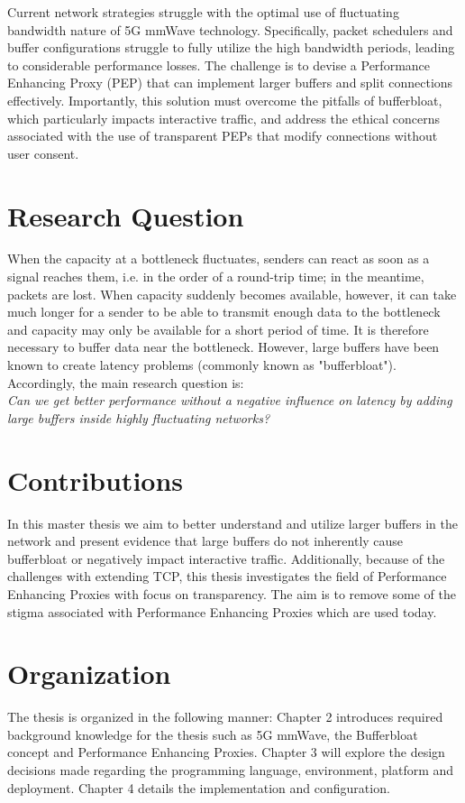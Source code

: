 \documentclass[a4paper,english, 11pt]{report}
\begin{document}
Current network strategies struggle with the optimal use of fluctuating bandwidth nature of 5G mmWave technology\cite{Srivastava_Fund_Panwar_2020}. Specifically, packet schedulers and buffer configurations struggle to fully utilize the high bandwidth periods, leading to considerable performance losses. The challenge is to devise a Performance Enhancing Proxy (PEP) that can implement larger buffers and split connections effectively. Importantly, this solution must overcome the pitfalls of bufferbloat\cite{hingane2020aqm}, which particularly impacts interactive traffic, and address the ethical concerns associated with the use of transparent PEPs that modify connections without user consent.

\section{Research Question}
When the capacity at a bottleneck fluctuates, senders can react as soon as a signal reaches them, i.e. in the order of a round-trip time; in the meantime, packets are lost. When capacity suddenly becomes available, however, it can take much longer for a sender to be able to transmit enough data to the bottleneck and capacity may only be available for a short period of time. It is therefore necessary to buffer data near the bottleneck. However, large buffers have been known to create latency problems (commonly known as "bufferbloat").\\

Accordingly, the main research question is:\\
\textit{Can we get better performance without a negative influence on latency by adding large buffers inside highly fluctuating networks?}

\section{Contributions}
In this master thesis we aim to better understand and utilize larger buffers in the network and present evidence that large buffers do not inherently cause bufferbloat or negatively impact interactive traffic. Additionally, because of the challenges with extending TCP\cite{tcp_extendable}, this thesis investigates the field of Performance Enhancing Proxies with focus on transparency. The aim is to remove some of the stigma associated with Performance Enhancing Proxies which are used today.

\section{Organization}
The thesis is organized in the following manner: Chapter 2 introduces required background knowledge for the thesis such as 5G mmWave, the Bufferbloat concept and Performance Enhancing Proxies. Chapter 3 will explore the design decisions made regarding the programming language, environment, platform and deployment. Chapter 4 details the implementation and configuration.\\
\end{document}
